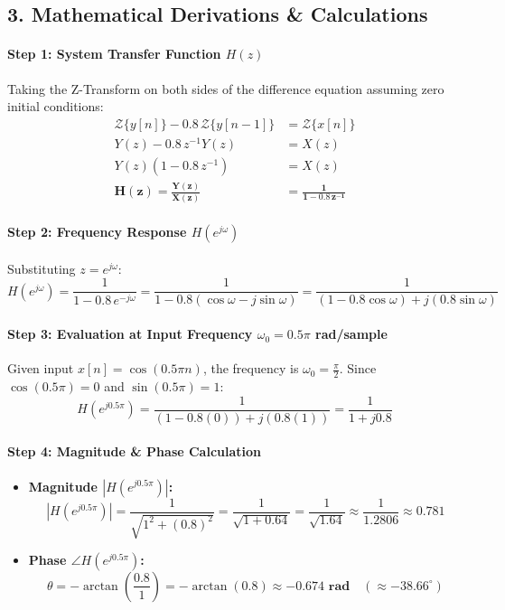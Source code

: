 \documentclass[11pt,a4paper]{article}
\begin{document}
\subsection*{3. Mathematical Derivations \& Calculations}

\paragraph{Step 1: System Transfer Function $H(z)$}
Taking the Z-Transform on both sides of the difference equation assuming zero initial conditions:
\begin{align}
    \mathcal{Z}\{y[n]\} - 0.8\,\mathcal{Z}\{y[n-1]\} &= \mathcal{Z}\{x[n]\} \nonumber \\
    Y(z) - 0.8\,z^{-1}Y(z) &= X(z) \nonumber \\
    Y(z)(1 - 0.8\,z^{-1}) &= X(z) \nonumber \\
    \mathbf{H(z) = \frac{Y(z)}{X(z)}} &\mathbf{= \frac{1}{1 - 0.8\,z^{-1}}}
\end{align}

\paragraph{Step 2: Frequency Response $H(e^{j\omega})$}
Substituting $z = e^{j\omega}$:
\begin{equation}
    H(e^{j\omega}) = \frac{1}{1 - 0.8\,e^{-j\omega}} = \frac{1}{1 - 0.8(\cos\omega - j\sin\omega)} = \frac{1}{(1 - 0.8\cos\omega) + j(0.8\sin\omega)}
\end{equation}

\paragraph{Step 3: Evaluation at Input Frequency $\omega_0 = 0.5\pi$ rad/sample}
Given input $x[n] = \cos(0.5\pi n)$, the frequency is $\omega_0 = \frac{\pi}{2}$.
Since $\cos(0.5\pi) = 0$ and $\sin(0.5\pi) = 1$:
\begin{equation}
    H(e^{j 0.5\pi}) = \frac{1}{(1 - 0.8(0)) + j(0.8(1))} = \frac{1}{1 + j0.8}
\end{equation}

\paragraph{Step 4: Magnitude \& Phase Calculation}
\begin{itemize}
    \item \textbf{Magnitude $|H(e^{j 0.5\pi})|$:}
    \begin{equation}
        |H(e^{j 0.5\pi})| = \frac{1}{\sqrt{1^2 + (0.8)^2}} = \frac{1}{\sqrt{1 + 0.64}} = \frac{1}{\sqrt{1.64}} \approx \frac{1}{1.2806} \approx \mathbf{0.781}
    \end{equation}
    \item \textbf{Phase $\angle H(e^{j 0.5\pi})$:}
    \begin{equation}
        \theta = -\arctan\left(\frac{0.8}{1}\right) = -\arctan(0.8) \approx \mathbf{-0.674\text{ rad}} \quad (\approx -38.66^\circ)
    \end{equation}
\end{itemize}
\end{document}

